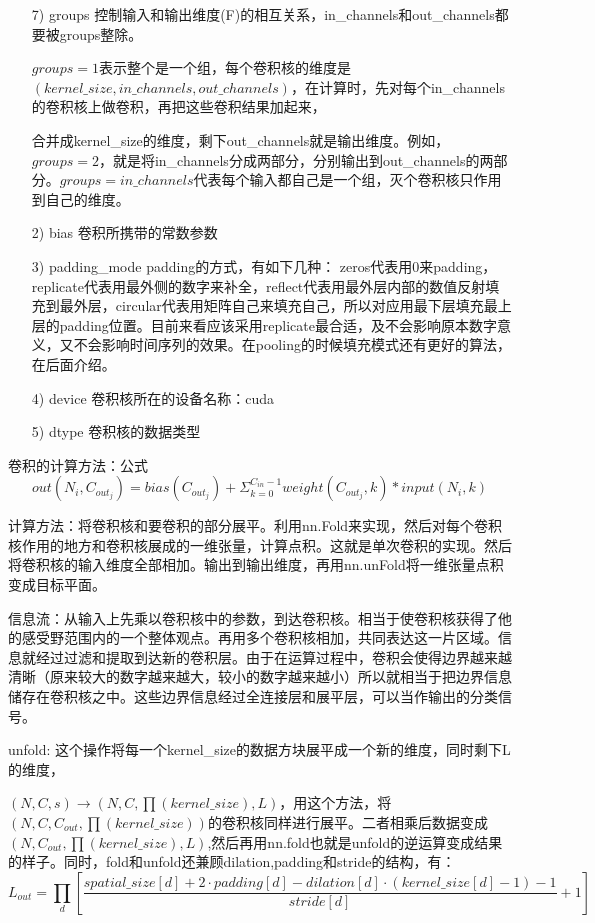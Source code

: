 \documentclass[11pt]{ctexart}
\begin{document}
\begin{itemize}
  \item [7)]
  groups 控制输入和输出维度(F)的相互关系，in\_channels和out\_channels都要被groups整除。\par $groups=1$表示整个是一个组，每个卷积核的维度是$(kernel\_size, in\_channels, out\_channels)$，在计算时，先对每个in\_channels的卷积核上做卷积，再把这些卷积结果加起来，\par 合并成kernel\_size的维度，剩下out\_channels就是输出维度。例如，$groups = 2$，就是将in\_channels分成两部分，分别输出到out\_channels的两部分。$groups = in\_channels$代表每个输入都自己是一个组，灭个卷积核只作用到自己的维度。
  \item [2)]
  bias 卷积所携带的常数参数
  \item [3)]
  padding\_mode padding的方式，有如下几种： zeros代表用0来padding，replicate代表用最外侧的数字来补全，reflect代表用最外层内部的数值反射填充到最外层，circular代表用矩阵自己来填充自己，所以对应用最下层填充最上层的padding位置。目前来看应该采用replicate最合适，及不会影响原本数字意义，又不会影响时间序列的效果。在pooling的时候填充模式还有更好的算法，在后面介绍。
  \item [4)]
  device 卷积核所在的设备名称：cuda
  \item [5)]
  dtype 卷积核的数据类型
\end{itemize}


卷积的计算方法：公式
$$out(N_i, C_{out_j}) = bias(C_{out_j}) + \Sigma^{C_{in}-1}_{k=0} weight(C_{out_j}, k) * input(N_i,k)$$

计算方法：将卷积核和要卷积的部分展平。利用nn.Fold来实现，然后对每个卷积核作用的地方和卷积核展成的一维张量，计算点积。这就是单次卷积的实现。然后将卷积核的输入维度全部相加。输出到输出维度，再用nn.unFold将一维张量点积变成目标平面。

信息流：从输入上先乘以卷积核中的参数，到达卷积核。相当于使卷积核获得了他的感受野范围内的一个整体观点。再用多个卷积核相加，共同表达这一片区域。信息就经过过滤和提取到达新的卷积层。由于在运算过程中，卷积会使得边界越来越清晰（原来较大的数字越来越大，较小的数字越来越小）所以就相当于把边界信息储存在卷积核之中。这些边界信息经过全连接层和展平层，可以当作输出的分类信号。

unfold: 这个操作将每一个kernel\_size的数据方块展平成一个新的维度，同时剩下L的维度，\par $(N,C,s) \rightarrow (N,C, \prod (kernel\_size),L)$，用这个方法，将$(N,C,C_{out},\prod (kernel\_size))$的卷积核同样进行展平。二者相乘后数据变成$(N,C_{out}, \prod (kernel\_size),L)$,然后再用nn.fold也就是unfold的逆运算变成结果的样子。同时，fold和unfold还兼顾dilation,padding和stride的结构，有：
$$L_{out} = \prod_d \left[ \frac{spatial\_size[d] + 2 \cdot padding[d] - dilation[d] \cdot (kernel\_size[d] -1) -1}{stride[d]} + 1 \right]$$
\end{document}
